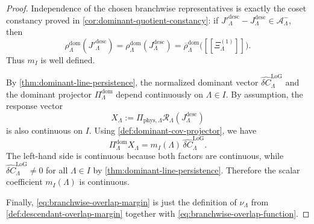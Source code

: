 \documentclass[11pt]{article}
\begin{document}
\begin{proof}
Independence of the chosen branchwise representatives is exactly the coset constancy proved in
\cref{cor:dominant-quotient-constancy}: if
\(
J'^{\mathrm{desc}}_{\Lambda}-J^{\mathrm{desc}}_{\Lambda}\in\mathcal A^-_{\Lambda}
\),
then
\[
\rho^{\mathrm{dom}}_{\Lambda}(J'^{\mathrm{desc}}_{\Lambda})
=
\rho^{\mathrm{dom}}_{\Lambda}(J^{\mathrm{desc}}_{\Lambda})
=
\overline{\rho}^{\mathrm{dom}}_{\Lambda}\big([\![\Xi^{(1)}_{\Lambda}]\!]\big).
\]
Thus \(m_I\) is well defined.

By \cref{thm:dominant-line-persistence}, the normalized dominant vector
\(
\widehat{\delta C}^{\mathrm{LoG}}_{\Lambda}
\)
and the dominant projector
\(
\Pi^{\mathrm{dom}}_{\Lambda}
\)
depend continuously on \(\Lambda\in I\).
By assumption, the response vector
\[
X_{\Lambda}
:=
\Pi_{\mathrm{phys},\Lambda}\mathcal R_{\Lambda}(J^{\mathrm{desc}}_{\Lambda})
\]
is also continuous on \(I\).
Using \cref{def:dominant-cov-projector}, we have
\[
\Pi^{\mathrm{dom}}_{\Lambda}X_{\Lambda}
=
m_I(\Lambda)\,\widehat{\delta C}^{\mathrm{LoG}}_{\Lambda}.
\]
The left-hand side is continuous because both factors are continuous, while
\(
\widehat{\delta C}^{\mathrm{LoG}}_{\Lambda}\neq 0
\)
for all \(\Lambda\in I\) by \cref{thm:dominant-line-persistence}.
Therefore the scalar coefficient \(m_I(\Lambda)\) is continuous.

Finally, \eqref{eq:branchwise-overlap-margin} is just the definition of \(\nu_{\Lambda}\) from
\cref{def:descendant-overlap-margin} together with \eqref{eq:branchwise-overlap-function}.
\end{proof}
\end{document}
